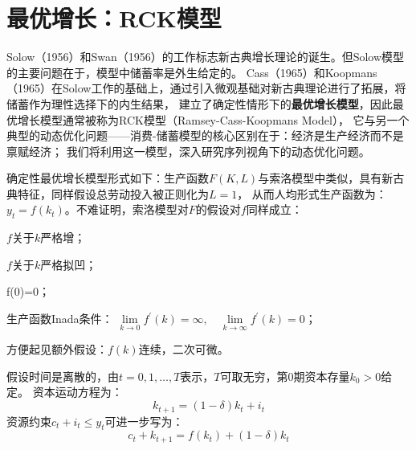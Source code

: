 
\section{最优增长：RCK模型} \label{sec-opt-growth}

Solow（1956）和Swan（1956）的工作标志新古典增长理论的诞生。但Solow模型的主要问题在于，模型中储蓄率是外生给定的。
Cass（1965）和Koopmans（1965）在Solow工作的基础上，通过引入微观基础对新古典理论进行了拓展，将储蓄作为理性选择下的内生结果，
建立了确定性情形下的\textbf{最优增长模型}，因此最优增长模型通常被称为RCK模型（Ramsey-Cass-Koopmans Model），
它与另一个典型的动态优化问题——消费-储蓄模型的核心区别在于：经济是生产经济而不是禀赋经济；
我们将利用这一模型，深入研究序列视角下的动态优化问题。

确定性最优增长模型形式如下：生产函数$F(K,L)$与索洛模型中类似，具有新古典特征，同样假设总劳动投入被正则化为$L=1$，
从而人均形式生产函数为：$y_t=f(k_t)$。不难证明，索洛模型对$F$的假设对$f$同样成立：
\begin{assumption} \label{as-f}
    $f$关于$k$严格增；
\end{assumption}
\begin{assumption}
    $f$关于$k$严格拟凹；
\end{assumption}
\begin{assumption}
    f(0)=0；
\end{assumption}
\begin{assumption} \label{as-f-inada}
    生产函数Inada条件：
    $\lim\limits_{k \rightarrow 0} f^{\prime}(k)=\infty, \quad \lim\limits_{k \rightarrow \infty} f^{\prime}(k)=0$；
\end{assumption}
\begin{assumption}
    方便起见额外假设：$f\left(k\right)$连续，二次可微。
\end{assumption}
假设时间是离散的，由$t=0,1,\dots,T$表示，$T$可取无穷，第0期资本存量$k_0>0$给定。
资本运动方程为：
\begin{equation*}
    k_{t+1} = (1-\delta)k_t + i_t
\end{equation*}
资源约束$c_t+i_t\leq y_t$可进一步写为：
\begin{equation*}
    c_t+k_{t+1}=f\left(k_t\right)+(1-\delta)k_t
\end{equation*}

